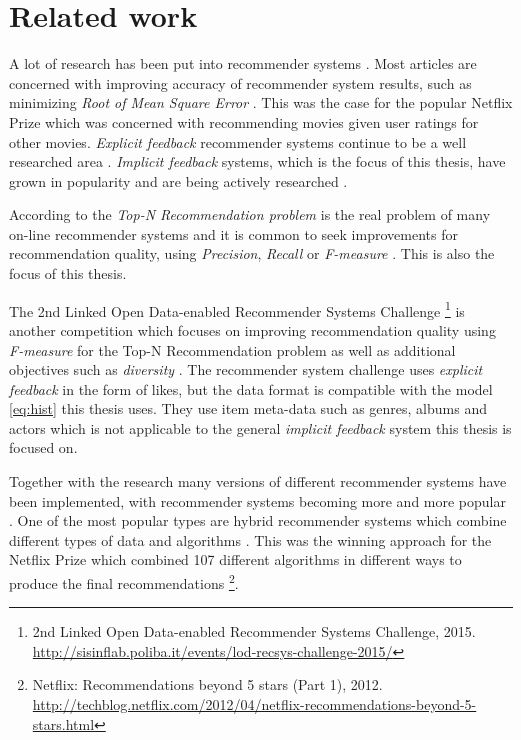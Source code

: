 \chapter{Related work}\label{cha:relwork}

A lot of research has been put into recommender systems \citep{bobadilla2013recommender}. Most articles are concerned with improving accuracy of recommender system results, such as minimizing \textit{Root of Mean Square Error} \prmse. This was the case for the popular Netflix Prize \citep{bennett2007netflix} which was concerned with recommending movies given user ratings for other movies. \textit{Explicit feedback} recommender systems continue to be a well researched area \citep{bobadilla2013recommender}. \textit{Implicit feedback} systems, which is the focus of this thesis, have grown in popularity and are being actively researched \citep{hu2008collaborative, bobadilla2013recommender}.

According to \citep{lai2012hybrid} the \textit{Top-N Recommendation problem} is the real problem of many on-line recommender systems and it is common to seek improvements for recommendation quality, using \textit{Precision}, \textit{Recall} or \textit{F-measure} \citep{bobadilla2013recommender}. This is also the focus of this thesis.

The 2nd Linked Open Data-enabled Recommender Systems Challenge
\footnote{2nd Linked Open Data-enabled Recommender Systems Challenge, 2015. \url{http://sisinflab.poliba.it/events/lod-recsys-challenge-2015/}}
is another competition which focuses on improving recommendation quality using \textit{F-measure} for the Top-N Recommendation problem as well as additional objectives such as \textit{diversity} \citep{bobadilla2013recommender}. The recommender system challenge uses \textit{explicit feedback} in the form of likes, but the data format is compatible with the model \eqref{eq:hist} this thesis uses. They use item meta-data such as genres, albums and actors which is not applicable to the general \textit{implicit feedback} system this thesis is focused on.

Together with the research many versions of different recommender systems have been implemented, with recommender systems becoming more and more popular \citep{bobadilla2013recommender}. One of the most popular types are hybrid recommender systems which combine different types of data and algorithms \citep{bobadilla2013recommender, lai2012hybrid}. This was the winning approach for the Netflix Prize which combined 107 different algorithms in different ways to produce the final recommendations
\footnote{ Netflix: Recommendations beyond 5 stars (Part 1), 2012. \url{http://techblog.netflix.com/2012/04/netflix-recommendations-beyond-5-stars.html} }.

